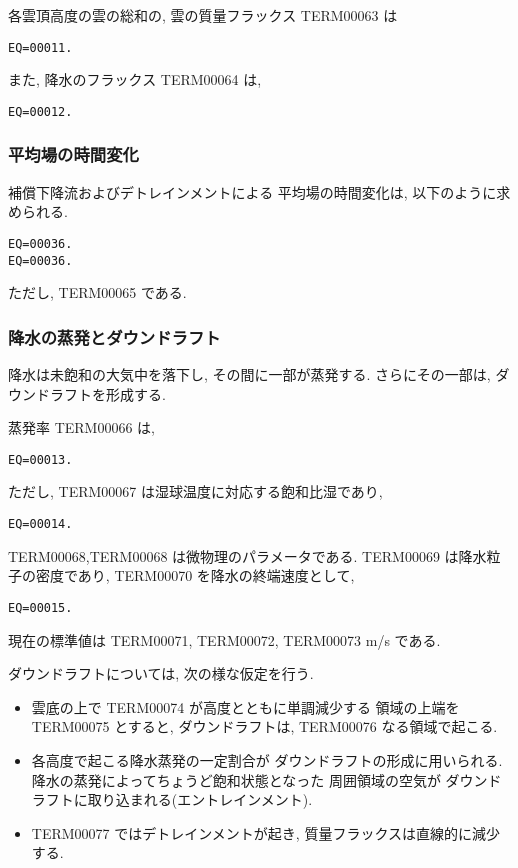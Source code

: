 各雲頂高度の雲の総和の, 
雲の質量フラックス TERM00063 は
\begin{verbatim}
EQ=00011.
\end{verbatim}

また, 降水のフラックス TERM00064 は,
\begin{verbatim}
EQ=00012.
\end{verbatim}

\subsubsection{平均場の時間変化}

補償下降流およびデトレインメントによる
平均場の時間変化は, 以下のように求められる.
\begin{verbatim}
EQ=00036.
EQ=00036.
\end{verbatim}
ただし, TERM00065 である.

\subsubsection{降水の蒸発とダウンドラフト}

降水は未飽和の大気中を落下し, その間に一部が蒸発する.
さらにその一部は, ダウンドラフトを形成する.

蒸発率 TERM00066 は,
\begin{verbatim}
EQ=00013.
\end{verbatim}
ただし, TERM00067 は湿球温度に対応する飽和比湿であり,
\begin{verbatim}
EQ=00014.
\end{verbatim}
TERM00068,TERM00068 は微物理のパラメータである.
TERM00069 は降水粒子の密度であり, TERM00070 を降水の終端速度として,
\begin{verbatim}
EQ=00015.
\end{verbatim}
現在の標準値は TERM00071, TERM00072, TERM00073 m/s である.

ダウンドラフトについては, 次の様な仮定を行う.
\begin{itemize}
\item 雲底の上で TERM00074 が高度とともに単調減少する
      領域の上端を TERM00075 とすると, ダウンドラフトは,
      TERM00076 なる領域で起こる.
\item 各高度で起こる降水蒸発の一定割合が
      ダウンドラフトの形成に用いられる.
      降水の蒸発によってちょうど飽和状態となった
      周囲領域の空気が
      ダウンドラフトに取り込まれる(エントレインメント).
\item TERM00077 ではデトレインメントが起き,
      質量フラックスは直線的に減少する.
\end{itemize}


